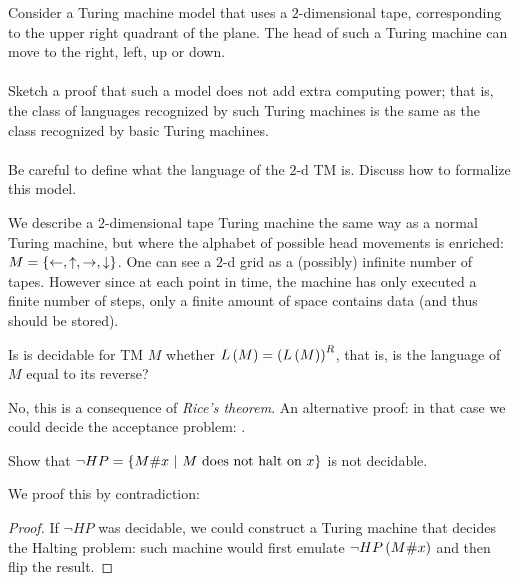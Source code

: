 \documentclass{article}
\begin{document}
\begin{exercise}
Consider a Turing machine model that uses a $2$-dimensional tape, corresponding to the upper right quadrant of the plane. The head of such a Turing machine can move to the right, left, up or down.
\paragraph{}
Sketch a proof that such a model does not add extra computing power; that is, the class of languages recognized by such Turing machines is the same as the class recognized by basic Turing machines.
\paragraph{}
Be careful to define what the language of the $2$-d TM is. Discuss how to formalize this model.
\begin{answer}
We describe a $2$-dimensional tape Turing machine the same way as a normal Turing machine, but where the alphabet of possible head movements is enriched: $M=\left\{ \leftarrow,\uparrow,\rightarrow,\downarrow \right\}$.
One can see a $2$-d grid as a (possibly) infinite number of tapes. However since at each point in time, the machine has only executed a finite number of steps, only a finite amount of space contains data (and thus should be stored).
\end{answer}
\end{exercise}

\begin{exercise}
Is is decidable for TM $M$ whether $L\left( M \right)=\left( L\left( M \right) \right)^R$, that is, is the language of $M$ equal to its reverse?
\begin{answer}
No, this is a consequence of \emph{Rice's theorem}. An alternative proof: in that case we could decide the acceptance problem: .
\end{answer}
\end{exercise}

\begin{exercise}
Show that $\neg HP=\left\{ M \#x\ |\ \mbox{$M$ does not halt on $x$} \right\}$ is not decidable.
\begin{answer}
We proof this by contradiction:
\begin{proof}
If $\neg HP$ was decidable, we could construct a Turing machine that decides the Halting problem: such machine would first emulate $\neg HP\left( M\#x \right)$ and then flip the result.
\end{proof}
\end{answer}
\end{exercise}
\end{document}
